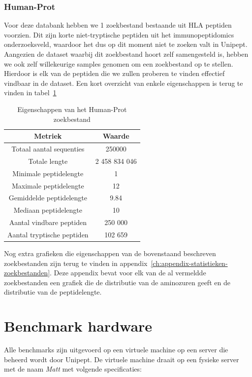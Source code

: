 \documentclass[11pt,dutch,faculty=we,layout=titlefont,underline=false,titleUppercase=true,titleUnderline=true]{ugent2016-report}
\begin{document}
    \subsubsection{Human-Prot}
    Voor deze databank hebben we 1 zoekbestand bestaande uit HLA peptiden voorzien.
    Dit zijn korte niet-tryptische peptiden uit het immunopeptidomics onderzoeksveld, waardoor het dus op dit moment niet te zoeken valt in Unipept.
    Aangezien de dataset waarbij dit zoekbestand hoort zelf samengesteld is, hebben we ook zelf willekeurige samples genomen om een zoekbestand op te stellen.
    Hierdoor is elk van de peptiden die we zullen proberen te vinden effectief vindbaar in de dataset.
    Een kort overzicht van enkele eigenschappen is terug te vinden in tabel~\ref{tab:humanprot_zoekbestand}

    \begin{table}[h!]
        \centering
        \begin{tabular}{ c c }
            Metriek                    & Waarde        \\
            \hline\hline
            Totaal aantal sequenties   & 250000        \\
            Totale lengte              & 2 458 834 046 \\
            Minimale peptidelengte     & 1             \\
            Maximale peptidelengte     & 12            \\
            Gemiddelde peptidelengte   & 9.84          \\
            Mediaan peptidelengte      & 10            \\
            Aantal vindbare peptiden   & 250 000       \\
            Aantal tryptische peptiden & 102 659       \\
            \hline
        \end{tabular}
        \caption{Eigenschappen van het Human-Prot zoekbestand}
        \label{tab:humanprot_zoekbestand}
    \end{table}


    Nog extra grafieken die eigenschappen van de bovenstaand beschreven zoekbestanden zijn terug te vinden in appendix~\ref{ch:appendix-statistieken-zoekbestanden}.
    Deze appendix bevat voor elk van de al vermeldde zoekbestanden een grafiek die de distributie van de aminozuren geeft en de distributie van de peptidelengte.


    \section{Benchmark hardware}\label{sec:benchmark-hardware}
    Alle benchmarks zijn uitgevoerd op een virtuele machine op een server die beheerd wordt door Unipept.
    De virtuele machine draait op een fysieke server met de naam \textit{Matt} met volgende specificaties:
\end{document}
